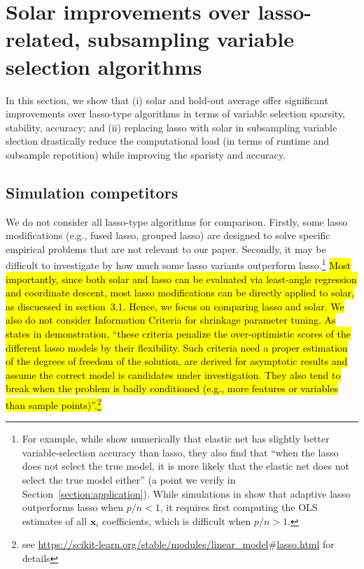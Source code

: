 \documentclass[12pt]{article}
\begin{document}

\section{Solar improvements over lasso-related, subsampling variable selection algorithms\label{section:comp}}

In this section, we show that (i) solar and hold-out average offer significant improvements over lasso-type algorithms in terms of variable selection sparsity, stability, accuracy; and (ii) replacing lasso with solar in subsampling variable slection drastically reduce the computational load (in terms of runtime and subsample repetition) while improving the sparisty and accuracy.

\subsection{Simulation competitors}

We do not consider all lasso-type algorithms for comparison. Firstly, some lasso modifications (e.g., fused lasso, grouped lasso) are designed to solve specific empirical problems that are not relevant to our paper. Secondly, it may be difficult to investigate by how much some lasso variants outperform lasso.\footnote{For example, while \citet{jia2010model} show numerically that elastic net has slightly better variable-selection accuracy than lasso, they also find that ``when the lasso does not select the true model, it is more likely that the elastic net does not select the true model either'' (a point we verify in Section~\ref{section:application}). While simulations in \citet{zou2006adaptive} show that adaptive lasso outperforms lasso when $p/n<1$, it requires first computing the OLS estimates of all $\mathbf{x}_i$ coefficients, which is difficult when $p/n>1$.} \hl{Most importantly, since both solar and lasso can be evaluated via least-angle regression and coordinate descent, most lasso modifications can be directly applied to solar, as discuessed in section~3.1. Hence, we focus on comparing lasso and solar. We also do not consider Information Criteria for shrinkage parameter tuning. As} \citet{scikit-learn} \hl{states in demonstration, ``these criteria penalize the over-optimistic scores of the different lasso models by their flexibility. Such criteria need a proper estimation of the degrees of freedom of the solution, are derived for asymptotic results and assume the correct model is candidates under investigation. They also tend to break when the problem is badly conditioned (e.g., more features or variables than sample points)''.\footnote{see \url{https://scikit-learn.org/stable/modules/linear_model}$\#$\url{lasso.html} for details}}
\end{document}
